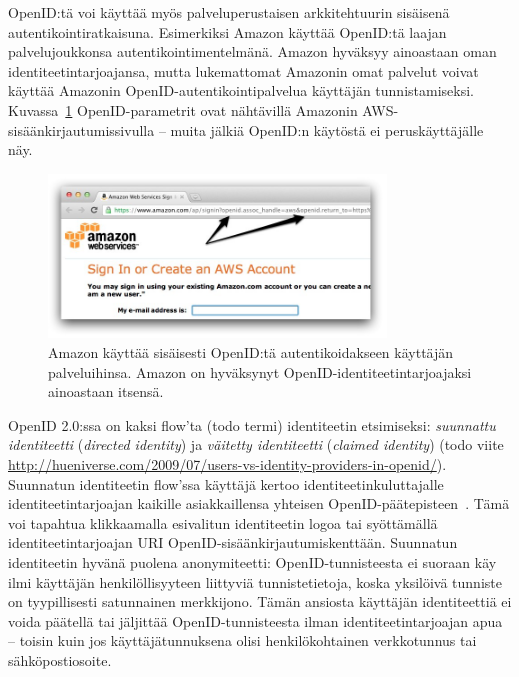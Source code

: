 \documentclass[finnish,gradu]{tktltiki}
\begin{document}
  OpenID:tä voi käyttää myös palveluperustaisen arkkitehtuurin sisäisenä autentikointiratkaisuna. Esimerkiksi Amazon käyttää OpenID:tä laajan palvelujoukkonsa autentikointimentelmänä. Amazon hyväksyy ainoastaan oman identiteetintarjoajansa, mutta lukemattomat Amazonin omat palvelut voivat käyttää Amazonin OpenID-autentikointipalvelua käyttäjän tunnistamiseksi. Kuvassa~\ref{fig:amazon_openid} OpenID-parametrit ovat nähtävillä Amazonin AWS-sisäänkirjautumissivulla -- muita jälkiä OpenID:n käytöstä ei peruskäyttäjälle näy.

  \begin{figure}
    \centering
    \includegraphics[width=0.8\textwidth]{images/amazon_openid.jpg}
    \caption{Amazon käyttää sisäisesti OpenID:tä autentikoidakseen käyttäjän palveluihinsa. Amazon on hyväksynyt  OpenID-identiteetintarjoajaksi ainoastaan itsensä.}
    \label{fig:amazon_openid}
  \end{figure}


  OpenID 2.0:ssa on kaksi flow'ta (todo termi) identiteetin etsimiseksi: \emph{suunnattu identiteetti}  (\emph{directed identity}) ja \emph{väitetty identiteetti} (\emph{claimed identity}) (todo viite \url{http://hueniverse.com/2009/07/users-vs-identity-providers-in-openid/}). Suunnatun identiteetin flow'ssa käyttäjä kertoo identiteetinkuluttajalle identiteetintarjoajan kaikille asiakkaillensa yhteisen OpenID-päätepisteen~\cite{openid_discovery_recordon_2008}. Tämä voi tapahtua klikkaamalla esivalitun identiteetin logoa tai syöttämällä identiteetintarjoajan URI OpenID-sisäänkirjautumiskenttään. Suunnatun identiteetin hyvänä puolena anonymiteetti: OpenID-tunnisteesta ei suoraan käy ilmi käyttäjän henkilöllisyyteen liittyviä tunnistetietoja, koska yksilöivä tunniste on tyypillisesti satunnainen merkkijono. Tämän ansiosta käyttäjän identiteettiä ei voida päätellä tai jäljittää OpenID-tunnisteesta ilman identiteetintarjoajan apua -- toisin kuin jos käyttäjätunnuksena olisi henkilökohtainen verkkotunnus tai sähköpostiosoite.
\end{document}
